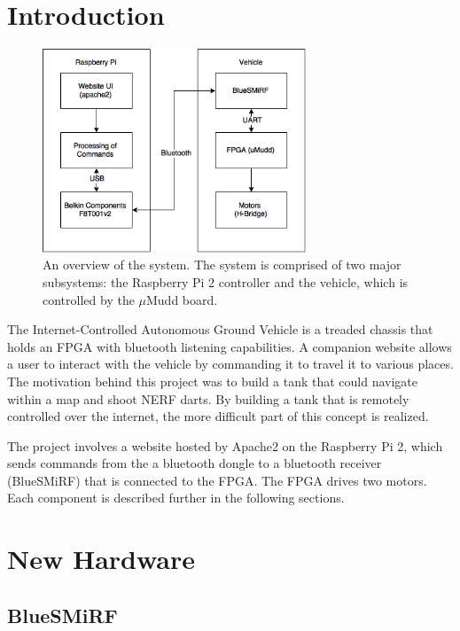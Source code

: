 \documentclass[12pt]{article}
\begin{document}
\newpage


\section{Introduction}

\begin{figure}[b!]
\begin{center}
\includegraphics[width=0.7\textwidth]{E155System}
\end{center}
\caption{An overview of the system. The system is comprised of two major subsystems: the Raspberry Pi 2 controller and the vehicle, which is controlled by the $\mu$Mudd board.}
\label{fig:sys}
\end{figure}

The Internet-Controlled Autonomous Ground Vehicle is a treaded chassis that holds an FPGA with bluetooth listening capabilities. A companion website allows a user to interact with the vehicle by commanding it to travel it to various places. The motivation behind this project was to build a tank that could navigate within a map and shoot NERF darts. By building a tank that is remotely controlled over the internet, the more difficult part of this concept is realized.

The project involves a website hosted by Apache2 on the Raspberry Pi 2, which sends commands from the a bluetooth dongle to a bluetooth receiver (BlueSMiRF) that is connected to the FPGA. The FPGA drives two motors. Each component is described further in the following sections.

\section{New Hardware}
\subsection{BlueSMiRF}
\end{document}
